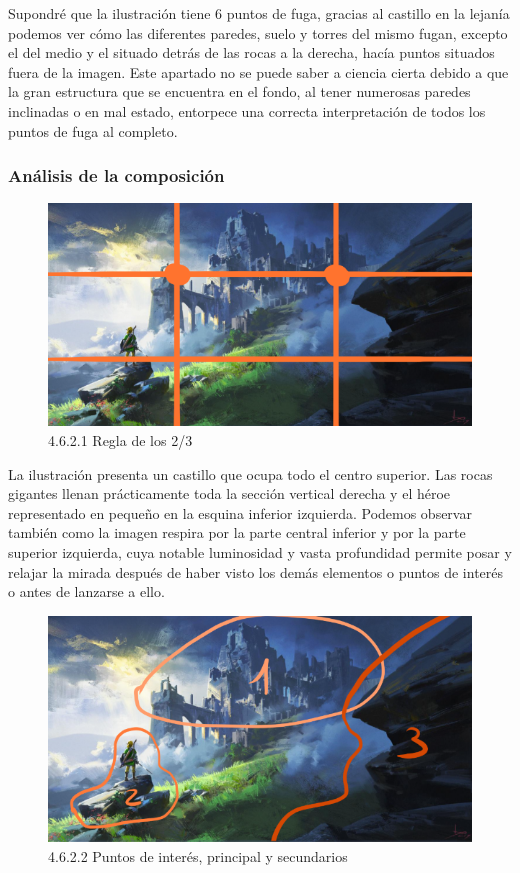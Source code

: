 \documentclass[12pt]{article}
\begin{document}
    Supondré que la ilustración tiene 6 puntos de fuga, gracias al castillo en la lejanía podemos ver cómo las diferentes paredes, suelo y torres del mismo fugan, excepto el del medio y el situado detrás de las rocas a la derecha, hacía puntos situados fuera de la imagen. Este apartado no se puede saber a ciencia cierta debido a que la gran estructura que se encuentra en el fondo, al tener numerosas paredes inclinadas o en mal estado, entorpece una correcta interpretación de todos los puntos de fuga al completo.

        \subsubsection{Análisis de la composición}

        
    \begin{figure}[H]
      \centering
      \includegraphics[scale=0.4]{images/Nerea/Nerea Zelda concept 621.PNG}
      \caption{\small 4.6.2.1 Regla de los 2/3}
    \end{figure}

    La ilustración presenta un castillo que ocupa todo el centro superior. Las rocas gigantes llenan prácticamente toda la sección vertical derecha y el héroe representado en pequeño en la esquina inferior izquierda. Podemos observar también como la imagen respira por la parte central inferior y por la parte superior izquierda, cuya notable luminosidad y vasta profundidad permite posar y relajar la mirada después de haber visto los demás elementos o puntos de interés o antes de lanzarse a ello.

    \begin{figure}[H]
      \centering
      \includegraphics[scale=0.4]{images/Nerea/Nerea Zelda concept 622.PNG}
      \caption{\small 4.6.2.2 Puntos de interés, principal y secundarios}
    \end{figure}
\end{document}
